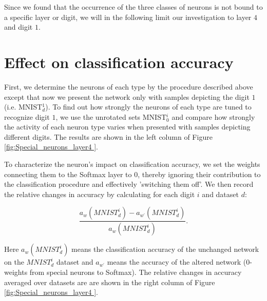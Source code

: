 \documentclass[10pt,a4paper]{article}
\begin{document}
\noindent Since we found that the occurrence of the three classes of neurons is not bound to a specific layer or digit, we will in the following limit our investigation to layer $4$ and digit $1$.

\section{Effect on classification accuracy}

\noindent First, we determine the neurons of each type by the procedure described above except that now we present the network only with samples depicting the digit  $1$ (i.e. MNIST$_d^1$). To find out how strongly the neurons of each type are tuned to recognize digit $1$, we use the unrotated sets MNIST$_0^i$ and compare how strongly the activity of each neuron type varies when presented with samples depicting different digits. The results are shown in the left column of Figure \ref{fig:Special_neurons_layer4 }. \newline

\noindent To characterize the neuron's impact on classification accuracy, we set the weights connecting them to the Softmax layer to 0, thereby ignoring their contribution to the classification procedure and effectively 'switching them off'. We then record the relative changes in accuracy by calculating for each digit $i$ and dataset $d$: 
	
\begin{displaymath}
\frac{a_w(MNIST_d^i) - a_{w^\prime}(MNIST_d^i)}{a_w(MNIST_d^i)}.
\end{displaymath}

\noindent Here $a_w(MNIST_d^i)$ means the classification accuracy of the unchanged network on the $MNIST_d^i$ dataset and $a_{w^\prime}$ means the accuracy of the altered network ($0$-weights from special neurons to Softmax). The relative changes in accuracy averaged over datasets are are shown in the right column of Figure \ref{fig:Special_neurons_layer4 }.\newline
\end{document}
